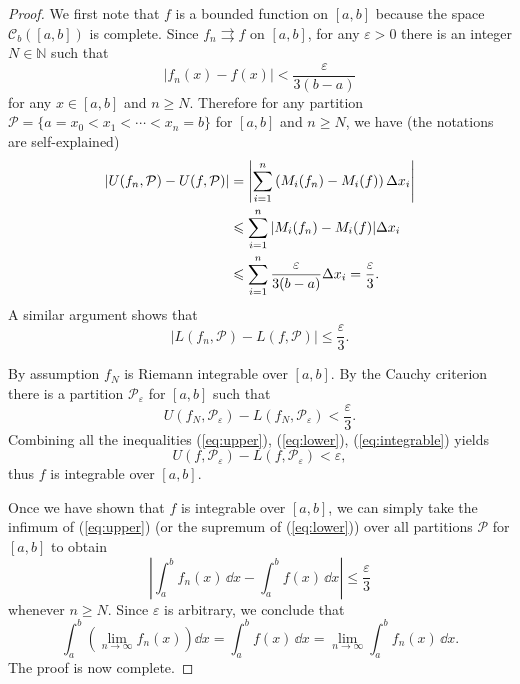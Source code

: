 \documentclass[11pt]{article}
\begin{document}
\begin{proof}
  We first note that $f$ is a bounded function on $[a,b]$ because the space $\mathcal{C}_b([a,b])$ is complete.
  Since $f_n \rightrightarrows f$ on $[a,b]$, for any $\varepsilon > 0$ there is an integer $N \in \mathbb{N}$ such that $$|f_n(x) - f(x)| < \dfrac{\varepsilon}{3(b-a)}$$ for any $x \in [a,b]$ and $n \geqslant N$.
  Therefore for any partition $\mathcal{P} = \{ a = x_0 < x_1 < \cdots < x_n = b \}$ for $[a,b]$ and $n \geqslant N$, we have (the notations are self-explained)
  \begin{align}
    |U(f_n, \mathcal{P}) - U(f,\mathcal{P})| &= \left| \sum_{i=1}^n \left( M_i(f_n) - M_i(f)  \right) \Delta x_i \right| \notag \\
    &\leqslant \sum_{i=1}^n |M_i(f_n) - M_i(f)| \Delta x_i \notag \\
    &\leqslant \sum_{i=1}^n \frac{\varepsilon}{3(b-a)} \Delta x_i = \frac{\varepsilon}{3}. \label{eq:upper} 
  \end{align}
  A similar argument shows that
  \begin{equation}
    \label{eq:lower}
    |L(f_n, \mathcal{P}) - L(f, \mathcal{P})| \leqslant	\frac{\varepsilon}{3}.
  \end{equation}
  
  By assumption $f_N$ is Riemann integrable over $[a,b]$.  By the Cauchy criterion there is a partition $\mathcal{P}_\varepsilon$ for $[a,b]$ such that
  \begin{equation}
    \label{eq:integrable}
    U(f_N, \mathcal{P}_\varepsilon) - L(f_N, \mathcal{P}_\varepsilon) < \frac{\varepsilon}{3}.
  \end{equation}
  Combining all the inequalities (\ref{eq:upper}), (\ref{eq:lower}), (\ref{eq:integrable}) yields
  \[
    U(f, \mathcal{P}_\varepsilon) - L(f, \mathcal{P}_\varepsilon) < \varepsilon,
  \]
  thus $f$ is integrable over $[a,b]$.

  Once we have shown that $f$ is integrable over $[a,b]$, we can simply take the infimum of (\ref{eq:upper}) (or the supremum of (\ref{eq:lower})) over all partitions $\mathcal{P}$ for $[a,b]$ to obtain
  \[
    \left| \int_a^b f_n(x) \, \dd x - \int_a^b f(x) \, \dd x \right| \leqslant \frac{\varepsilon}{3}
  \]
  whenever $n \geqslant N$.  Since $\varepsilon$ is arbitrary, we conclude that
  \[
    \int_a^b \left( \lim_{n \to \infty} f_n(x) \right) \dd x = \int_a^b f(x) \, \dd x = \lim_{n \to \infty} \int_a^b f_n(x) \, \dd x.
  \]
  The proof is now complete.
\end{proof}
\end{document}
